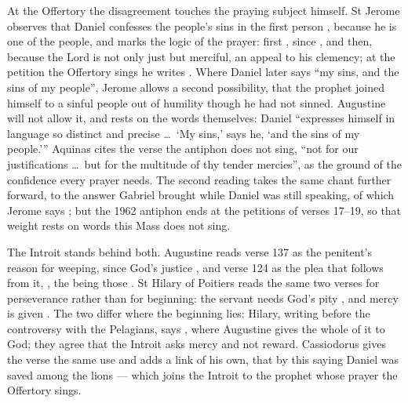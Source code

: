 At the Offertory the disagreement touches the praying subject himself. St
Jerome observes that Daniel confesses the people's sins in
the first person , because he is one of the
people, and marks the logic of the prayer: first , since , and then, because
the Lord is not only just but merciful, an appeal  to his clemency; at the petition the Offertory sings he writes
. Where Daniel later says ``my
sins, and the sins of my people'', Jerome allows a second possibility, that the
prophet joined himself to a sinful people out of humility though he had not
sinned. Augustine will not allow it, and rests on the words themselves:
Daniel ``expresses himself in language so distinct and precise \dots\ `My
sins,' says he, `and the sins of my people.''' Aquinas cites the verse the antiphon does not sing, ``not for our
justifications \dots\ but for the multitude of thy tender mercies'', as the
ground of the confidence every prayer needs. The second reading takes
the same chant further forward, to the answer Gabriel brought while Daniel was
still speaking, of which Jerome says ; but the
1962 antiphon ends at the petitions of verses 17--19, so that weight rests on
words this Mass does not sing.

The Introit stands behind both. Augustine reads verse 137 as the penitent's
reason for weeping, since God's justice , and
verse 124 as the plea that follows from it, , the
 being those . St Hilary of Poitiers reads the same two verses for perseverance rather
than for beginning: the servant needs God's pity , and mercy is given . The two differ where the beginning
lies: Hilary, writing before the controversy with the Pelagians, says
, where Augustine gives the
whole of it to God; they agree that the Introit asks mercy and not reward. Cassiodorus gives the verse the same use and adds a link of his own, that by this saying Daniel was
saved among the lions --- which joins the Introit to the prophet whose prayer
the Offertory sings.

